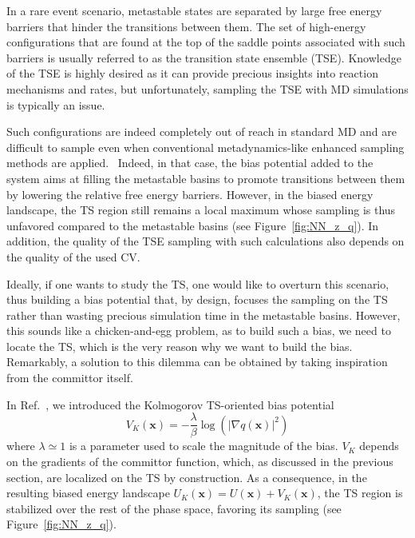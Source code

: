         In a rare event scenario, metastable states are separated by large free energy barriers that hinder the transitions between them.
        The set of high-energy configurations that are found at the top of the saddle points associated with such barriers is usually referred to as the transition state ensemble (TSE).
        Knowledge of the TSE is highly desired as it can provide precious insights into reaction mechanisms and rates, but unfortunately, sampling the TSE with MD simulations is typically an issue.
        
        Such configurations are indeed completely out of reach in standard MD and are difficult to sample even when conventional metadynamics-like enhanced sampling methods are applied.~\cite{laio2002escaping, invernizzi2020rethinking}
        Indeed, in that case, the bias potential added to the system aims at filling the metastable basins to promote transitions between them by lowering the relative free energy barriers.
        However, in the biased energy landscape, the TS region still remains a local maximum whose sampling is thus unfavored compared to the metastable basins (see Figure~\ref{fig:NN_z_q}).
        In addition, the quality of the TSE sampling with such calculations also depends on the quality of the used CV. 
        
        Ideally, if one wants to study the TS, one would like to overturn this scenario, thus building a bias potential that, by design, focuses the sampling on the TS rather than wasting precious simulation time in the metastable basins.
        However, this sounds like a chicken-and-egg problem, as to build such a bias, we need to locate the TS, which is the very reason why we want to build the bias.
        Remarkably, a solution to this dilemma can be obtained by taking inspiration from the committor itself.
        
        In Ref.~\cite{kang2024computing}, we introduced the Kolmogorov TS-oriented bias potential
            \begin{equation}
                V_K(\textbf{x})=-\frac{\lambda}{\beta}\log (|\nabla q(\textbf{x})|^2)
                \label{eq:kolmogorov_bias}
            \end{equation}
        where $\lambda \simeq 1$ is a parameter used to scale the magnitude of the bias. 
        $V_K$ depends on the gradients of the committor function, which, as discussed in the previous section, are localized on the TS by construction.
        As a consequence, in the resulting biased energy landscape $U_K(\textbf{x}) = U(\textbf{x}) + V_K(\textbf{x})$, the TS region is stabilized over the rest of the phase space, favoring its sampling (see Figure~\ref{fig:NN_z_q}).

